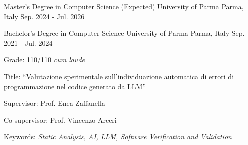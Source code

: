 

\begin{cventries}

	\cventry
		{Master's Degree in Computer Science (Expected)} %
		{University of Parma} %
		{Parma, Italy} %
		{Sep. 2024 - Jul. 2026} %
		{
		}
	
  \cventry
    {Bachelor's Degree in Computer Science} %
    {University of Parma} %
    {Parma, Italy} %
    {Sep. 2021 - Jul. 2024} %
    {
			\begin{cvitems-no-bullet} %
				\item {Grade: 110/110 \emph{cum laude}}
				\item {Title: \textquotedblleft{Valutazione sperimentale sull’individuazione automatica di errori di programmazione nel codice generato da LLM}\textquotedblright}
				\item {Supervisor: Prof. Enea Zaffanella}
				\item {Co-supervisor: Prof. Vincenzo Arceri}
				\item {Keywords: \emph{Static Analysis, AI, LLM, Software Verification and Validation}}
      \end{cvitems-no-bullet}
    }

\end{cventries}
